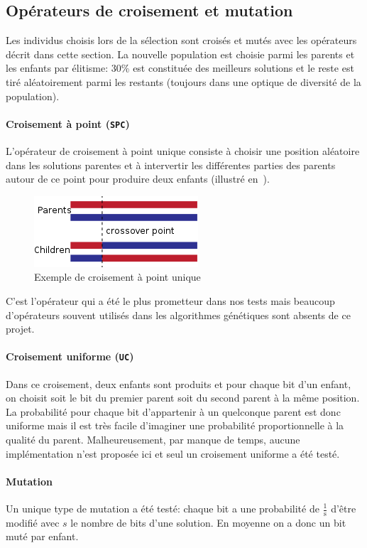 \documentclass[10pt]{article}
\begin{document}
	\subsection{Opérateurs de croisement et mutation}
		
		Les individus choisis lors de la sélection sont croisés et mutés avec les opérateurs décrit dans cette section. La nouvelle population est choisie parmi les parents et les enfants par élitisme: 30\% est constituée des meilleurs solutions et le reste est tiré aléatoirement parmi les restants (toujours dans une optique de diversité de la population).
		
		\paragraph{Croisement à point (\texttt{SPC})}{
		L'opérateur de croisement à point unique consiste à choisir une position aléatoire dans les solutions parentes et à intervertir les différentes parties des parents autour de ce point pour produire deux enfants (illustré en~).
			\begin{figure}[h!]
				\centering
				\includegraphics[width=0.3\linewidth]{spc.png}
				\caption{Exemple de croisement à point unique}
				\label{fig-spc}
			\end{figure}
			C'est l'opérateur qui a été le plus prometteur dans nos tests mais beaucoup d'opérateurs souvent utilisés dans les algorithmes génétiques sont absents de ce projet.
		}
		\paragraph{Croisement uniforme (\texttt{UC})}{
		Dans ce croisement, deux enfants sont produits et pour chaque bit d'un enfant, on choisit soit le bit du premier parent soit du second parent à la même position. La probabilité pour chaque bit d'appartenir à un quelconque parent est donc uniforme mais il est très facile d'imaginer une probabilité proportionnelle à la qualité du parent. Malheureusement, par manque de temps, aucune implémentation n'est proposée ici et seul un croisement uniforme a été testé.
		}
		\paragraph{Mutation}{
			Un unique type de mutation a été testé: chaque bit a une probabilité de $\frac{1}{\text{s}}$ d'être modifié avec $s$ le nombre de bits d'une solution. En moyenne on a donc un bit muté par enfant.
		}
	
\end{document}
